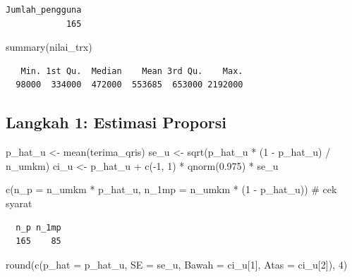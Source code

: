 \documentclass[
  indonesian,
  letterpaper,
]{book}
\newenvironment{Shaded}{\begin{snugshade}}{\end{snugshade}}
\newcommand{\AttributeTok}[1]{\textcolor[rgb]{0.40,0.45,0.13}{#1}}
\newcommand{\CommentTok}[1]{\textcolor[rgb]{0.37,0.37,0.37}{#1}}
\newcommand{\DecValTok}[1]{\textcolor[rgb]{0.68,0.00,0.00}{#1}}
\newcommand{\FloatTok}[1]{\textcolor[rgb]{0.68,0.00,0.00}{#1}}
\newcommand{\FunctionTok}[1]{\textcolor[rgb]{0.28,0.35,0.67}{#1}}
\newcommand{\NormalTok}[1]{\textcolor[rgb]{0.00,0.23,0.31}{#1}}
\newcommand{\OtherTok}[1]{\textcolor[rgb]{0.00,0.23,0.31}{#1}}
\newcommand{\SpecialCharTok}[1]{\textcolor[rgb]{0.37,0.37,0.37}{#1}}
\begin{document}
\begin{verbatim}
Jumlah_pengguna 
            165 
\end{verbatim}

\begin{Shaded}
\begin{Highlighting}[]
\FunctionTok{summary}\NormalTok{(nilai\_trx)}
\end{Highlighting}
\end{Shaded}

\begin{verbatim}
   Min. 1st Qu.  Median    Mean 3rd Qu.    Max. 
  98000  334000  472000  553685  653000 2192000 
\end{verbatim}

\subsection{Langkah 1: Estimasi
Proporsi}\label{langkah-1-estimasi-proporsi}

\begin{Shaded}
\begin{Highlighting}[]
\NormalTok{p\_hat\_u }\OtherTok{\textless{}{-}} \FunctionTok{mean}\NormalTok{(terima\_qris)}
\NormalTok{se\_u }\OtherTok{\textless{}{-}} \FunctionTok{sqrt}\NormalTok{(p\_hat\_u }\SpecialCharTok{*}\NormalTok{ (}\DecValTok{1} \SpecialCharTok{{-}}\NormalTok{ p\_hat\_u) }\SpecialCharTok{/}\NormalTok{ n\_umkm)}
\NormalTok{ci\_u }\OtherTok{\textless{}{-}}\NormalTok{ p\_hat\_u }\SpecialCharTok{+} \FunctionTok{c}\NormalTok{(}\SpecialCharTok{{-}}\DecValTok{1}\NormalTok{, }\DecValTok{1}\NormalTok{) }\SpecialCharTok{*} \FunctionTok{qnorm}\NormalTok{(}\FloatTok{0.975}\NormalTok{) }\SpecialCharTok{*}\NormalTok{ se\_u}

\FunctionTok{c}\NormalTok{(}\AttributeTok{n\_p =}\NormalTok{ n\_umkm }\SpecialCharTok{*}\NormalTok{ p\_hat\_u, }\AttributeTok{n\_1mp =}\NormalTok{ n\_umkm }\SpecialCharTok{*}\NormalTok{ (}\DecValTok{1} \SpecialCharTok{{-}}\NormalTok{ p\_hat\_u)) }\CommentTok{\# cek syarat}
\end{Highlighting}
\end{Shaded}

\begin{verbatim}
  n_p n_1mp 
  165    85 
\end{verbatim}

\begin{Shaded}
\begin{Highlighting}[]
\FunctionTok{round}\NormalTok{(}\FunctionTok{c}\NormalTok{(}\AttributeTok{p\_hat =}\NormalTok{ p\_hat\_u, }\AttributeTok{SE =}\NormalTok{ se\_u, }\AttributeTok{Bawah =}\NormalTok{ ci\_u[}\DecValTok{1}\NormalTok{], }\AttributeTok{Atas =}\NormalTok{ ci\_u[}\DecValTok{2}\NormalTok{]), }\DecValTok{4}\NormalTok{)}
\end{Highlighting}
\end{Shaded}
\end{document}
